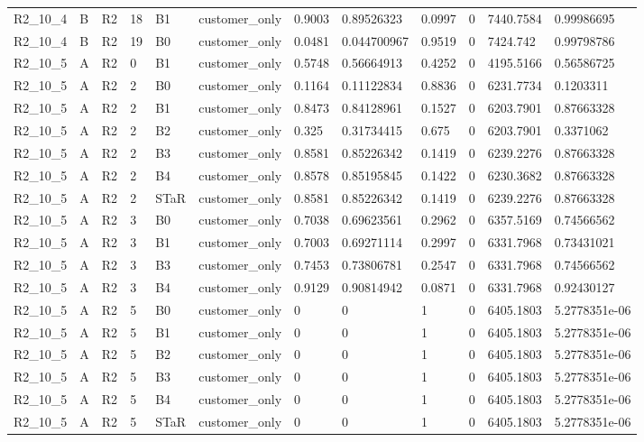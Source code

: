 \begin{longtable}{llllllllllll}
R2\_10\_4 & B & R2 & 18 & B1 & customer\_only & 0.9003 & 0.89526323 & 0.0997 & 0 & 7440.7584 & 0.99986695 \\
R2\_10\_4 & B & R2 & 19 & B0 & customer\_only & 0.0481 & 0.044700967 & 0.9519 & 0 & 7424.742 & 0.99798786 \\
R2\_10\_5 & A & R2 & 0 & B1 & customer\_only & 0.5748 & 0.56664913 & 0.4252 & 0 & 4195.5166 & 0.56586725 \\
R2\_10\_5 & A & R2 & 2 & B0 & customer\_only & 0.1164 & 0.11122834 & 0.8836 & 0 & 6231.7734 & 0.1203311 \\
R2\_10\_5 & A & R2 & 2 & B1 & customer\_only & 0.8473 & 0.84128961 & 0.1527 & 0 & 6203.7901 & 0.87663328 \\
R2\_10\_5 & A & R2 & 2 & B2 & customer\_only & 0.325 & 0.31734415 & 0.675 & 0 & 6203.7901 & 0.3371062 \\
R2\_10\_5 & A & R2 & 2 & B3 & customer\_only & 0.8581 & 0.85226342 & 0.1419 & 0 & 6239.2276 & 0.87663328 \\
R2\_10\_5 & A & R2 & 2 & B4 & customer\_only & 0.8578 & 0.85195845 & 0.1422 & 0 & 6230.3682 & 0.87663328 \\
R2\_10\_5 & A & R2 & 2 & STaR & customer\_only & 0.8581 & 0.85226342 & 0.1419 & 0 & 6239.2276 & 0.87663328 \\
R2\_10\_5 & A & R2 & 3 & B0 & customer\_only & 0.7038 & 0.69623561 & 0.2962 & 0 & 6357.5169 & 0.74566562 \\
R2\_10\_5 & A & R2 & 3 & B1 & customer\_only & 0.7003 & 0.69271114 & 0.2997 & 0 & 6331.7968 & 0.73431021 \\
R2\_10\_5 & A & R2 & 3 & B3 & customer\_only & 0.7453 & 0.73806781 & 0.2547 & 0 & 6331.7968 & 0.74566562 \\
R2\_10\_5 & A & R2 & 3 & B4 & customer\_only & 0.9129 & 0.90814942 & 0.0871 & 0 & 6331.7968 & 0.92430127 \\
R2\_10\_5 & A & R2 & 5 & B0 & customer\_only & 0 & 0 & 1 & 0 & 6405.1803 & 5.2778351e-06 \\
R2\_10\_5 & A & R2 & 5 & B1 & customer\_only & 0 & 0 & 1 & 0 & 6405.1803 & 5.2778351e-06 \\
R2\_10\_5 & A & R2 & 5 & B2 & customer\_only & 0 & 0 & 1 & 0 & 6405.1803 & 5.2778351e-06 \\
R2\_10\_5 & A & R2 & 5 & B3 & customer\_only & 0 & 0 & 1 & 0 & 6405.1803 & 5.2778351e-06 \\
R2\_10\_5 & A & R2 & 5 & B4 & customer\_only & 0 & 0 & 1 & 0 & 6405.1803 & 5.2778351e-06 \\
R2\_10\_5 & A & R2 & 5 & STaR & customer\_only & 0 & 0 & 1 & 0 & 6405.1803 & 5.2778351e-06 \\

\end{longtable}
